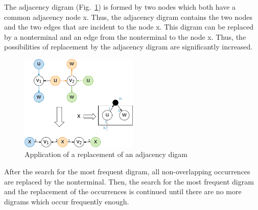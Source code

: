 \documentclass[a4paper]{scrartcl}
\begin{document}
The adjacency digram (Fig.~\ref{fig:adjazenzDigram}) is formed by two nodes which both have a common adjacency node x. Thus, the adjacency digram contains the two nodes and the two edges that are incident to the node x. This digram can be replaced by a nonterminal and an edge from the nonterminal to the node x.
Thus, the possibilities of replacement by the adjacency digram are significantly increased.


\begin{figure}[h]
	\centering
	\includegraphics[width=0.5\textwidth]{img/adjazenzDigram}
	\caption{Application of a replacement of an adjacency digam}
	\label{fig:adjazenzDigram}
\end{figure}

After the search for the most frequent digram, all non-overlapping occurrences are replaced by the nonterminal. Then, the search for the most frequent digram and the replacement of the occurrences is continued until there are no more digrams which occur frequently enough.
\end{document}
